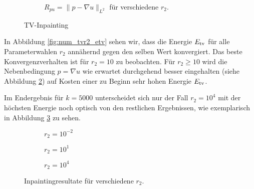 \documentclass{mythesis}
\begin{document}
\begin{figure}[ht]
\begin{subfigure}{0.6\textwidth}
	\caption{$R_{pu} = \|p - \nabla u\|_{L^2}$ für verschiedene $r_2$. \hspace{2cm} \mbox{}}
	\label{fig:num_tvr2_pu}
    \end{subfigure}
    \caption{TV-Inpainting}
\end{figure}

In Abbildung \ref{fig:num_tvr2_etv} sehen wir, dass die Energie $E_{\mathrm{tv}}$ für alle Parameterwahlen $r_2$ annähernd gegen den selben Wert konvergiert.
Das beste Konvergenzverhalten ist für $r_2 = 10$ zu beobachten.
Für $r_2 \ge 10$ wird die Nebenbedingung $p = \nabla u$ wie erwartet durchgehend besser eingehalten (siehe Abbildung \ref{fig:num_tvr2_pu}) auf Kosten einer zu Beginn sehr hohen Energie $E_{\mathrm{tv}}$.

Im Endergebnis für $k = 5000$ unterscheidet sich nur der Fall $r_2 = 10^4$ mit der höchsten Energie noch optisch von den restlichen Ergebnissen, wie exemplarisch in Abbildung \ref{fig:num_tvr2_png} zu sehen.

\begin{figure}[ht]
    \centering
    \begin{subfigure}{0.2\textwidth}
	\centering
	\caption{$r_2=10^{-2}$}
    \end{subfigure}%
    \begin{subfigure}{0.2\textwidth}
	\centering
	\caption{$r_2=10^{1}$}
    \end{subfigure}%
    \begin{subfigure}{0.2\textwidth}
	\centering
	\caption{$r_2=10^{4}$}
    \end{subfigure}%
    \caption{Inpaintingresultate für verschiedene $r_2$.}
    \label{fig:num_tvr2_png}
\end{figure}
\end{document}

